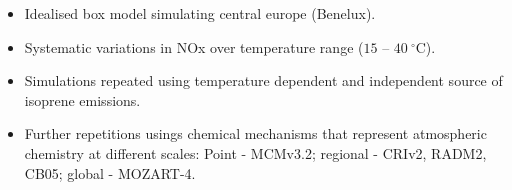 \begin{BlueBox}
    \vskip-1cm
    \begin{block}{}
        \begin{itemize} 
            \item Idealised box model simulating central europe (Benelux).
            \item Systematic variations in NOx over temperature range ($15$ -- $40~^{\circ}$C).
            \item Simulations repeated using temperature dependent and independent source of isoprene emissions.
            \item Further repetitions usings chemical mechanisms that represent atmospheric chemistry at different scales: Point - MCMv3.2; regional - CRIv2, RADM2, CB05; global - MOZART-4.
        \end{itemize}
    \end{block}
\end{BlueBox}
